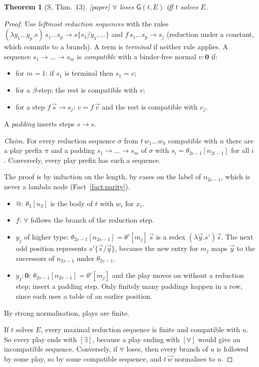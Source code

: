 \documentclass[11pt]{article}
\newcommand{\Ground}{\mathbf{0}}
\newcommand{\Gm}{\mathsf{G}}
\newcommand{\Paper}{\textsf{[paper]}}
\theoremstyle{plain}
\newtheorem{theorem}{Theorem}[section]
\theoremstyle{definition}
\theoremstyle{remark}
\begin{document}
\begin{theorem}[S, Thm.~13]\label{thm:game}
\Paper{} $\forall$ loses $\Gm(t,E)$ iff $t$ solves $E$.
\end{theorem}
\begin{proof}
Use \emph{leftmost reduction sequences} with the rules
$(\lambda y_1\dots y_p.s)\,s_1\dots s_p\to s\{s_1/y_1,\dots\}$ and
$f\,s_1\dots s_p\to s_j$ (reduction under a constant, which commits to a
branch).  A term is \emph{terminal} if neither rule applies.  A sequence
$s_1\to\dots\to s_m$ is \emph{compatible} with a binder-free normal
$v:\Ground$ if:
\begin{itemize}
\item for $m=1$: if $s_1$ is terminal then $s_1=v$;
\item for a $\beta$-step: the rest is compatible with $v$;
\item for a step $f\,\vec s\to s_j$: $v=f\,\vec v$ and the rest is
  compatible with $v_j$.
\end{itemize}
A \emph{padding} inserts steps $s\to s$.

\emph{Claim.} For every reduction sequence $\sigma$ from
$t\,w_1\dots w_k$ compatible with $u$ there are a play prefix $\pi$ and
a padding $s_1\to\dots\to s_m$ of $\sigma$ with
$s_i=\theta_{2i-1}[n_{2i-1}]$ for all $i$.  Conversely, every play prefix
has such a sequence.

The proof is by induction on the length, by cases on the label of
$n_{2s-1}$, which is never a lambda node (Fact~\ref{fact:parity}).
\begin{itemize}
\item $@$: $\theta_3[n_3]$ is the body of $t$ with $w_i$ for $x_i$.
\item $f$: $\forall$ follows the branch of the reduction step.
\item $y_j$ of higher type: $\theta_{2s-1}[n_{2s-1}]=\theta'[m_j]\,\vec s$
  is a redex $(\lambda\vec y.s')\vec s$.  The next odd position
  represents $s'\{\vec s/\vec y\}$, because the new entry for $m_j$ maps
  $\vec y$ to the successors of $n_{2s-1}$ under $\theta_{2s-1}$.
\item $y_j:\Ground$: $\theta_{2s-1}[n_{2s-1}]=\theta'[m_j]$ and the play
  moves on without a reduction step; insert a padding step.  Only
  finitely many paddings happen in a row, since each uses a table of
  an earlier position.
\end{itemize}
By strong normalisation, plays are finite.

If $t$ solves $E$, every maximal reduction sequence is finite and
compatible with $u$.  So every play ends with $[\exists]$, because a
play ending with $[\forall]$ would give an incompatible sequence.
Conversely, if $\forall$ loses, then every branch of $u$ is followed by
some play, so by some compatible sequence, and $t\,\vec w$ normalises to
$u$.
\end{proof}
\end{document}
